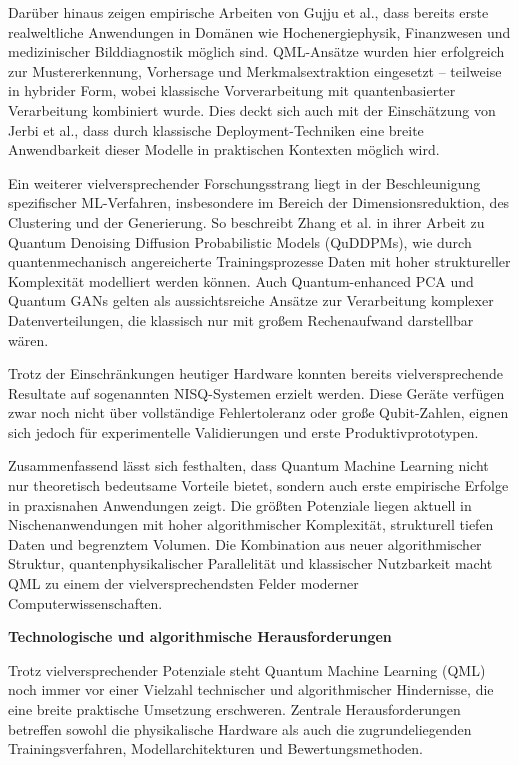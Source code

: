 Darüber hinaus zeigen empirische Arbeiten von Gujju et al., dass bereits erste realweltliche Anwendungen in Domänen wie Hochenergiephysik, Finanzwesen und medizinischer Bilddiagnostik möglich sind. QML-Ansätze wurden hier erfolgreich zur Mustererkennung, Vorhersage und Merkmalsextraktion eingesetzt – teilweise in hybrider Form, wobei klassische Vorverarbeitung mit quantenbasierter Verarbeitung kombiniert wurde. Dies deckt sich auch mit der Einschätzung von Jerbi et al., dass durch klassische Deployment-Techniken eine breite Anwendbarkeit dieser Modelle in praktischen Kontexten möglich wird. \cite{jerbiShadowsQuantumMachine2024}

Ein weiterer vielversprechender Forschungsstrang liegt in der Beschleunigung spezifischer ML-Verfahren, insbesondere im Bereich der Dimensionsreduktion, des Clustering und der Generierung. So beschreibt Zhang et al. \cite{zhuang_quantum_2024} in ihrer Arbeit zu Quantum Denoising Diffusion Probabilistic Models (QuDDPMs), wie durch quantenmechanisch angereicherte Trainingsprozesse Daten mit hoher struktureller Komplexität modelliert werden können. Auch Quantum-enhanced PCA und Quantum GANs gelten als aussichtsreiche Ansätze zur Verarbeitung komplexer Datenverteilungen, die klassisch nur mit großem Rechenaufwand darstellbar wären.

Trotz der Einschränkungen heutiger Hardware konnten bereits vielversprechende Resultate auf sogenannten NISQ-Systemen erzielt werden. Diese Geräte verfügen zwar noch nicht über vollständige Fehlertoleranz oder große Qubit-Zahlen, eignen sich jedoch für experimentelle Validierungen und erste Produktivprototypen. \cite{peral-garciaSystematicLiteratureReview2024, gujjuQuantumMachineLearning2024}

Zusammenfassend lässt sich festhalten, dass Quantum Machine Learning nicht nur theoretisch bedeutsame Vorteile bietet, sondern auch erste empirische Erfolge in praxisnahen Anwendungen zeigt. Die größten Potenziale liegen aktuell in Nischenanwendungen mit hoher algorithmischer Komplexität, strukturell tiefen Daten und begrenztem Volumen. Die Kombination aus neuer algorithmischer Struktur, quantenphysikalischer Parallelität und klassischer Nutzbarkeit macht QML zu einem der vielversprechendsten Felder moderner Computerwissenschaften.


\vspace{1em}
\noindent\textbf{Technologische und algorithmische Herausforderungen}

\noindent
Trotz vielversprechender Potenziale steht Quantum Machine Learning (QML) noch immer vor einer Vielzahl technischer und algorithmischer Hindernisse, die eine breite praktische Umsetzung erschweren. Zentrale Herausforderungen betreffen sowohl die physikalische Hardware als auch die zugrundeliegenden Trainingsverfahren, Modellarchitekturen und Bewertungsmethoden.


